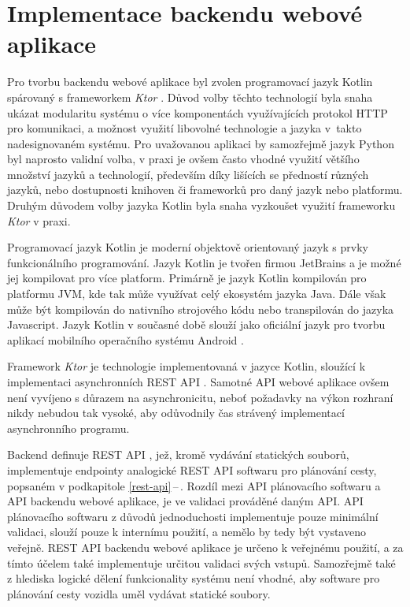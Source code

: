 \documentclass[czech, bachelor]{diploma}
\newcommand{\peteref}[1]{\ref{#1}\,--\,\nameref{#1}}
\begin{document}
\section{Implementace backendu webové aplikace}

Pro tvorbu backendu webové aplikace byl zvolen programovací jazyk Kotlin spárovaný s frameworkem \emph{Ktor} \cite{ktor-source}. 
Důvod volby těchto technologií byla snaha ukázat modularitu systému o více komponentách využívajících protokol HTTP
pro komunikaci, a možnost využití libovolné technologie a jazyka v~takto nadesignovaném systému. Pro uvažovanou aplikaci
by samozřejmě jazyk Python byl naprosto validní volba, v praxi je ovšem často vhodné využití většího množství jazyků a
technologií, především díky lišících se předností různých jazyků, nebo dostupnosti knihoven či frameworků pro daný jazyk nebo
platformu. Druhým důvodem volby jazyka Kotlin byla snaha vyzkoušet využití frameworku \emph{Ktor} v praxi.

Programovací jazyk Kotlin je moderní objektově orientovaný jazyk s prvky funkcionálního programování. Jazyk Kotlin je tvořen
firmou JetBrains a je možné jej kompilovat pro více platform. Primárně je jazyk Kotlin kompilován pro platformu JVM, kde tak může
využívat celý ekosystém jazyka Java. Dále však může být kompilován do nativního strojového kódu nebo transpilován do jazyka
Javascript. Jazyk Kotlin v současné době slouží jako oficiální jazyk pro tvorbu aplikací mobilního operačního systému Android
\cite{kotlin-android-source}.

Framework \emph{Ktor} je technologie implementovaná v jazyce Kotlin, sloužící k implementaci asynchronních REST API 
\cite{ktor-source}. Samotné API webové aplikace ovšem není vyvíjeno s důrazem na asynchronicitu, neboť požadavky na výkon
rozhraní nikdy nebudou tak vysoké, aby odůvodnily čas strávený implementací asynchronního programu.

Backend definuje REST API \cite{rest-source}, jež, kromě vydávání statických souborů, implementuje endpointy analogické REST API
softwaru pro plánování cesty, popsaném v podkapitole \peteref{rest-api}. Rozdíl mezi API plánovacího softwaru a API backendu
webové aplikace, je ve validaci prováděné daným API. API plánovacího softwaru z důvodů jednoduchosti implementuje pouze minimální
validaci, slouží pouze k internímu použití, a nemělo by tedy být vystaveno veřejně. REST API backendu webové aplikace je určeno
k veřejnému použití, a za tímto účelem také implementuje určitou validaci svých vstupů. Samozřejmě také z hlediska logické dělení
funkcionality systému není vhodné, aby software pro plánování cesty vozidla uměl vydávat statické soubory.
\end{document}
